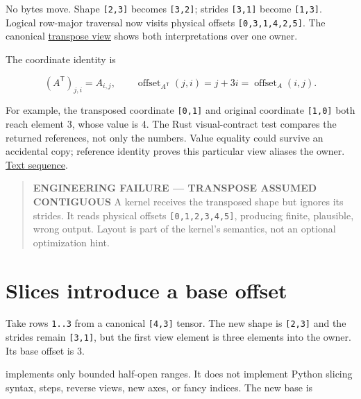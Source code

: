 No bytes move. Shape \texttt{{[}2,3{]}} becomes \texttt{{[}3,2{]}};
strides \texttt{{[}3,1{]}} become \texttt{{[}1,3{]}}. Logical row-major
traversal now visits physical offsets \texttt{{[}0,3,1,4,2,5{]}}. The
canonical
\href{https://github.com/hermonai/inside-the-llm-engine/blob/astra-visual-rewrite/diagrams/tensor/transpose-view.txt}{transpose
view} shows both interpretations over one owner.


The coordinate identity is

\begin{equation}
(A^{\mathsf T})_{j,i}=A_{i,j},\qquad
\operatorname{offset}_{A^{\mathsf T}}(j,i)=j+3i
=\operatorname{offset}_A(i,j).
\end{equation}

For example, the transposed coordinate \texttt{{[}0,1{]}} and original
coordinate \texttt{{[}1,0{]}} both reach element 3, whose value is 4.
The Rust visual-contract test compares the returned references, not only
the numbers. Value equality could survive an accidental copy; reference
identity proves this particular view aliases the owner.
\href{https://github.com/hermonai/inside-the-llm-engine/blob/astra-visual-rewrite/figures/generated/tensor-transpose.txt}{Text
sequence}.

\begin{quote}
\textbf{ENGINEERING FAILURE --- TRANSPOSE ASSUMED CONTIGUOUS} A kernel
receives the transposed shape but ignores its strides. It reads physical
offsets \texttt{{[}0,1,2,3,4,5{]}}, producing finite, plausible, wrong
output. Layout is part of the kernel's semantics, not an optional
optimization hint.
\end{quote}

\section{Slices introduce a base
offset}\label{slices-introduce-a-base-offset}

Take rows \texttt{1..3} from a canonical \texttt{{[}4,3{]}} tensor. The
new shape is \texttt{{[}2,3{]}} and the strides remain
\texttt{{[}3,1{]}}, but the first view element is three elements into
the owner. Its base offset is 3.

\texttt{} implements only bounded
half-open ranges. It does not implement Python slicing syntax, steps,
reverse views, new axes, or fancy indices. The new base is

